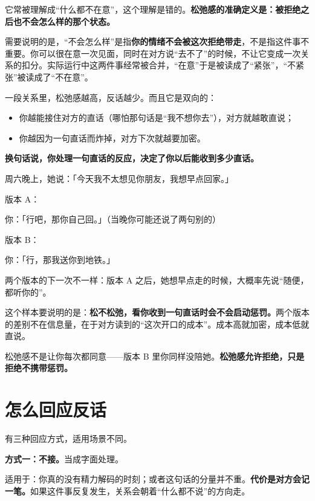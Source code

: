 它常被理解成“什么都不在意”，这个理解是错的。\textbf{松弛感的准确定义是：被拒绝之后也不会怎么样的那个状态。}

需要说明的是，“不会怎么样”是指\textbf{你的情绪不会被这次拒绝带走}，不是指这件事不重要。你可以很在意一次见面，同时在对方说“去不了”的时候，不让它变成一次关系的扣分。实际运行中这两件事经常被合并，“在意”于是被读成了“紧张”，“不紧张”被读成了“不在意”。

一段关系里，松弛感越高，反话越少。而且它是双向的：

\begin{itemize}
\item 你越能接住对方的直话（哪怕那句话是“我不想你去”），对方就越敢直说；
\item 你越因为一句直话而炸掉，对方下次就越要加密。
\end{itemize}

\textbf{换句话说，你处理一句直话的反应，决定了你以后能收到多少直话。}

\par
\begin{mdquote}
周六晚上，她说：「今天我不太想见你朋友，我想早点回家。」\par
\vspace{0.3\baselineskip}
版本 A：\par
你：「行吧，那你自己回。」（当晚你可能还说了两句别的）\par
\vspace{0.5\baselineskip}
版本 B：\par
你：「行，那我送你到地铁。」\par
\vspace{0.3\baselineskip}
两个版本的下一次不一样：版本 A 之后，她想早点走的时候，大概率先说“随便，都听你的”。
\end{mdquote}

这个样本要说明的是：\textbf{松不松弛，看你收到一句直话时会不会启动惩罚。}两个版本的差别不在信息量，在于对方读到的“这次开口的成本”。成本高就加密，成本低就直说。

松弛感不是让你每次都同意——版本 B 里你同样没陪她。\textbf{松弛感允许拒绝，只是拒绝不携带惩罚。}

\section{怎么回应反话}

有三种回应方式，适用场景不同。

\textbf{方式一：不接。}当成字面处理。

适用于：你真的没有精力解码的时刻；或者这句话的分量并不重。\textbf{代价是对方会记一笔。}如果这件事反复发生，关系会朝着“什么都不说”的方向走。

